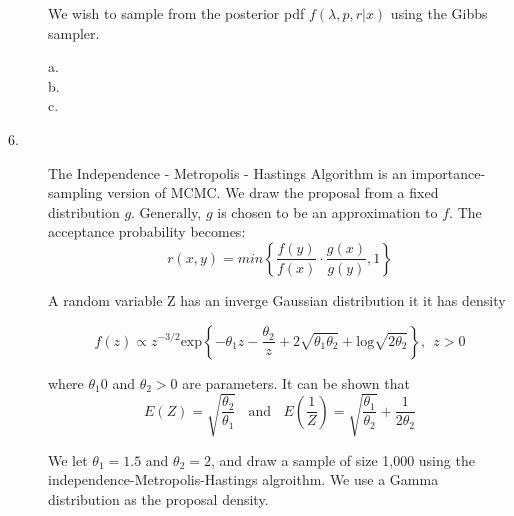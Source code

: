 \documentclass[12pt]{article}
\newcommand{\lo}{\mathrm{log}}
\begin{document}
\begin{description}
We wish to sample from the posterior pdf $f(\lambda, p, r | x)$ using the Gibbs sampler.\
\begin{description}
\item[a.]
\item[b.]
\item[c.]
\end{description}


\item[6. ] The Independence - Metropolis - Hastings Algorithm is an importance-sampling version of MCMC. We draw the proposal from a fixed distribution $g$. Generally, $g$ is chosen to be an approximation to $f$. The acceptance probability becomes:
\[r(x, y) = min\left\{ \frac{f(y)}{f(x)} \cdot \frac{g(x)}{g(y)}, 1 \right\}\]

A random variable Z has an inverge Gaussian distribution it it has density

\[f(z) \propto z^{-3/2} \mathrm{exp}\left\{ -\theta_1z - \frac{\theta_2}{z} + 2\sqrt{\theta_1\theta_2} + \lo \sqrt{2\theta_2}\right\}, \ \ z >0\]

where $\theta_1 0$ and $\theta_2 >0$ are parameters. It can be shown that 
\[E(Z) = \sqrt{\frac{\theta_2}{\theta_1}} \ \ \ \ \mathrm{and} \ \ \ \ E\left(\frac{1}{Z} \right)= \sqrt{\frac{\theta_1}{\theta_2}} + \frac{1}{2\theta_2}\]

We let $\theta_1 = 1.5$ and $\theta_2 = 2$, and draw a sample of size 1,000 using the independence-Metropolis-Hastings algroithm. We use a Gamma distribution as the proposal density. 
\end{description}
\end{document}
